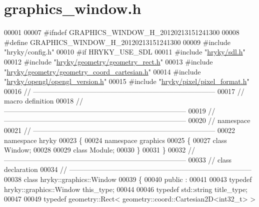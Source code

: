\hypertarget{graphics__window_8h_source}{\section{graphics\-\_\-window.\-h}
}

\begin{DoxyCode}
00001 
00007 \textcolor{preprocessor}{#ifndef GRAPHICS\_WINDOW\_H\_20120213151241300}
00008 \textcolor{preprocessor}{}\textcolor{preprocessor}{#define GRAPHICS\_WINDOW\_H\_20120213151241300}
00009 \textcolor{preprocessor}{}\textcolor{preprocessor}{#include "hryky/config.h"}
00010 \textcolor{preprocessor}{#if HRYKY\_USE\_SDL}
00011 \textcolor{preprocessor}{}\textcolor{preprocessor}{#include "\hyperlink{sdl_8h}{hryky/sdl.h}"}
00012 \textcolor{preprocessor}{#include "\hyperlink{geometry__rect_8h}{hryky/geometry/geometry_rect.h}"}
00013 \textcolor{preprocessor}{#include "\hyperlink{geometry__coord__cartesian_8h}{hryky/geometry/geometry_coord_cartesian.h}"}
00014 \textcolor{preprocessor}{#include "\hyperlink{opengl__version_8h}{hryky/opengl/opengl_version.h}"}
00015 \textcolor{preprocessor}{#include "\hyperlink{pixel__format_8h}{hryky/pixel/pixel_format.h}"}
00016 \textcolor{comment}{//
      ------------------------------------------------------------------------------}
00017 \textcolor{comment}{// macro definition}
00018 \textcolor{comment}{//
      ------------------------------------------------------------------------------}
00019 \textcolor{comment}{//
      ------------------------------------------------------------------------------}
00020 \textcolor{comment}{// namespace}
00021 \textcolor{comment}{//
      ------------------------------------------------------------------------------}
00022 \textcolor{keyword}{namespace }hryky
00023 \{
00024 \textcolor{keyword}{namespace }graphics
00025 \{
00027     \textcolor{keyword}{class }Window;
00028 
00029     \textcolor{keyword}{class }Module;
00030 \}
00031 \}
00032 \textcolor{comment}{//
      ------------------------------------------------------------------------------}
00033 \textcolor{comment}{// class declaration}
00034 \textcolor{comment}{//
      ------------------------------------------------------------------------------}
00038 \textcolor{comment}{}\textcolor{keyword}{class }hryky::graphics::Window
00039 \{
00040 \textcolor{keyword}{public} :
00041 
00043     \textcolor{keyword}{typedef} hryky::graphics::Window this\_type;
00044 
00046     \textcolor{keyword}{typedef} std::string             title\_type;
00047 
00049     \textcolor{keyword}{typedef} geometry::Rect< geometry::coord::Cartesian2D<int32\_t> >

\end{DoxyCode}
